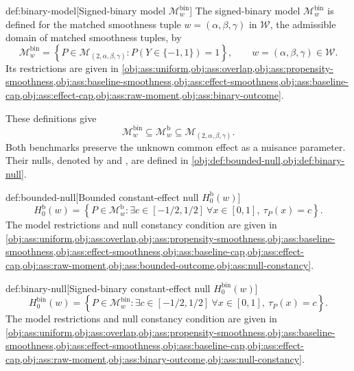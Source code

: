 \documentclass[11pt]{article}
\begin{document}
\begin{definitionv}{def:binary-model}[Signed-binary model $\mathcal M^{\mathrm{bin}}_w$]
The signed-binary model \(\mathcal M^{\mathrm{bin}}_w\) is defined for the matched smoothness tuple \(w=(\alpha,\beta,\gamma)\) in \(\mathcal W\), the admissible domain of matched smoothness tuples, by
\[
\mathcal M^{\mathrm{bin}}_w
=
\left\{
P\in\mathcal M_{(2,\alpha,\beta,\gamma)}:
P(Y\in\{-1,1\})=1
\right\},
\qquad
w=(\alpha,\beta,\gamma)\in\mathcal W.
\]
Its restrictions are given in \cref{obj:ass:uniform,obj:ass:overlap,obj:ass:propensity-smoothness,obj:ass:baseline-smoothness,obj:ass:effect-smoothness,obj:ass:baseline-cap,obj:ass:effect-cap,obj:ass:raw-moment,obj:ass:binary-outcome}.
\end{definitionv}

These definitions give
\[
\mathcal M^{\mathrm{bin}}_w
\subseteq
\mathcal M^{\mathrm b}_w
\subseteq
\mathcal M_{(2,\alpha,\beta,\gamma)}.
\]
Both benchmarks preserve the unknown common effect as a nuisance parameter. Their nulls, denoted by  and , are defined in \cref{obj:def:bounded-null,obj:def:binary-null}.

\begin{definitionv}{def:bounded-null}[Bounded constant-effect null $H_0^{\mathrm b}(w)$]
\[
H_0^{\mathrm b}(w)
=
\left\{
P\in\mathcal M^{\mathrm b}_w:
\exists c\in[-1/2,1/2]\ 
\forall x\in[0,1],\ \tau_P(x)=c
\right\}.
\]
The model restrictions and null constancy condition are given in \cref{obj:ass:uniform,obj:ass:overlap,obj:ass:propensity-smoothness,obj:ass:baseline-smoothness,obj:ass:effect-smoothness,obj:ass:baseline-cap,obj:ass:effect-cap,obj:ass:raw-moment,obj:ass:bounded-outcome,obj:ass:null-constancy}.
\end{definitionv}

\begin{definitionv}{def:binary-null}[Signed-binary constant-effect null $H_0^{\mathrm{bin}}(w)$]
\[
H_0^{\mathrm{bin}}(w)
=
\left\{
P\in\mathcal M^{\mathrm{bin}}_w:
\exists c\in[-1/2,1/2]\ 
\forall x\in[0,1],\ \tau_P(x)=c
\right\}.
\]
The model restrictions and null constancy condition are given in \cref{obj:ass:uniform,obj:ass:overlap,obj:ass:propensity-smoothness,obj:ass:baseline-smoothness,obj:ass:effect-smoothness,obj:ass:baseline-cap,obj:ass:effect-cap,obj:ass:raw-moment,obj:ass:binary-outcome,obj:ass:null-constancy}.
\end{definitionv}
\end{document}

